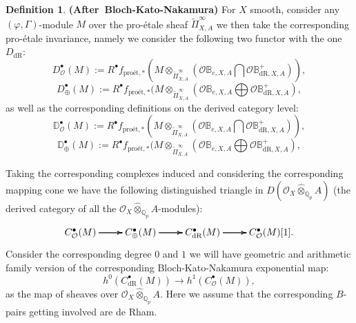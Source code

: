 \documentclass[12pt]{amsart}
\theoremstyle{definition}
\newtheorem{definition}[theorem]{Definition}
\numberwithin{equation}{section}
\begin{document}
\begin{definition} \mbox{\bf{(After Bloch-Kato-Nakamura)}}
For $X$ smooth, consider any $(\varphi,\Gamma)$-module $M$ over the pro-\'etale sheaf $\widetilde{\Pi}^\infty_{X,A}$ we then take the corresponding pro-\'etale invariance, namely we consider the following two functor with the one $D_\mathrm{dR}$:
\begin{displaymath}
D^\bullet_\mathcal{O}(M):= R^\bullet f_{\text{pro\'et},*}(M\otimes_{\widetilde{\Pi}^\infty_{X,A}} (\mathcal{O}\mathbb{B}_{e,X,A}\bigcap \mathcal{O}\mathbb{B}^+_{\mathrm{dR},X,A})),	
\end{displaymath}
\begin{displaymath}
D^\bullet_\oplus(M):= R^\bullet f_{\text{pro\'et},*}(M\otimes_{\widetilde{\Pi}^\infty_{X,A}} (\mathcal{O}\mathbb{B}_{e,X,A}\bigoplus \mathcal{O}\mathbb{B}^+_{\mathrm{dR},X,A}),	
\end{displaymath}
as well as the corresponding definitions on the derived category level:
\begin{displaymath}
\mathbb{D}^\bullet_\mathcal{O}(M):= R^\bullet f_{\text{pro\'et},*}(M\otimes_{\widetilde{\Pi}^\infty_{X,A}} (\mathcal{O}\mathbb{B}_{e,X,A}\bigcap \mathcal{O}\mathbb{B}^+_{\mathrm{dR},X,A})),	
\end{displaymath}
\begin{displaymath}
\mathbb{D}^\bullet_\oplus(M):= R^\bullet f_{\text{pro\'et},*}(M\otimes_{\widetilde{\Pi}^\infty_{X,A}} (\mathcal{O}\mathbb{B}_{e,X,A}\bigoplus \mathcal{O}\mathbb{B}^+_{\mathrm{dR},X,A}),	
\end{displaymath}








Taking the corresponding complexes induced and considering the corresponding mapping cone we have the following distinguished triangle in $D(\mathcal{O}_X\widehat{\otimes}_{\mathbb{Q}_p}A)$ (the derived category of all the $\mathcal{O}_X\widehat{\otimes}_{\mathbb{Q}_p}A$-modules):
\[
\xymatrix@R+0pc@C+0pc{
C^\bullet_\mathcal{O}(M)\ar[r] \ar[r] \ar[r] &C^\bullet_\oplus(M)    \ar[r] \ar[r] \ar[r]  &C^\bullet_\mathrm{dR}(M) \ar[r] \ar[r] \ar[r] &C^\bullet_\mathcal{O}(M)[1].
}
\]
Consider the corresponding degree $0$ and $1$ we will have geometric and arithmetic family version of the corresponding Bloch-Kato-Nakamura exponential map:
\begin{displaymath}
h^0(C^\bullet_\mathrm{dR}(M))\rightarrow h^1(C^\bullet_\mathcal{O}(M)),	
\end{displaymath}
as the map of sheaves over $\mathcal{O}_X\widehat{\otimes}_{\mathbb{Q}_p}A$. Here we assume that the corresponding $B$-pairs getting involved are de Rham. 

\end{definition}
\end{document}
